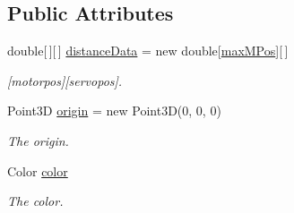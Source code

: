 \subsection*{Public Attributes}
\begin{DoxyCompactItemize}
\item 
\hypertarget{class_l_i_d_a_r___w_p_f___t_e_s_t_1_1_measurement_a3eeb9d0c5672c921c65c94ba69e1baa0}{}double\mbox{[}$\,$\mbox{]}\mbox{[}$\,$\mbox{]} \hyperlink{class_l_i_d_a_r___w_p_f___t_e_s_t_1_1_measurement_a3eeb9d0c5672c921c65c94ba69e1baa0}{distance\+Data} = new double\mbox{[}\hyperlink{class_l_i_d_a_r___w_p_f___t_e_s_t_1_1_measurement_a9605c77615e3be20ae9b2bcb0c3840c7}{max\+M\+Pos}\mbox{]}\mbox{[}$\,$\mbox{]}\label{class_l_i_d_a_r___w_p_f___t_e_s_t_1_1_measurement_a3eeb9d0c5672c921c65c94ba69e1baa0}

\begin{DoxyCompactList}\small\item\em \mbox{[}motorpos\mbox{]}\mbox{[}servopos\mbox{]}. \end{DoxyCompactList}\item 
\hypertarget{class_l_i_d_a_r___w_p_f___t_e_s_t_1_1_measurement_a7d54322660d56bf770949d58d70eda38}{}Point3\+D \hyperlink{class_l_i_d_a_r___w_p_f___t_e_s_t_1_1_measurement_a7d54322660d56bf770949d58d70eda38}{origin} = new Point3\+D(0, 0, 0)\label{class_l_i_d_a_r___w_p_f___t_e_s_t_1_1_measurement_a7d54322660d56bf770949d58d70eda38}

\begin{DoxyCompactList}\small\item\em The origin. \end{DoxyCompactList}\item 
\hypertarget{class_l_i_d_a_r___w_p_f___t_e_s_t_1_1_measurement_ab3dc896e9a7a696d1af21db05c76cbe5}{}Color \hyperlink{class_l_i_d_a_r___w_p_f___t_e_s_t_1_1_measurement_ab3dc896e9a7a696d1af21db05c76cbe5}{color}\label{class_l_i_d_a_r___w_p_f___t_e_s_t_1_1_measurement_ab3dc896e9a7a696d1af21db05c76cbe5}

\begin{DoxyCompactList}\small\item\em The color. \end{DoxyCompactList}\end{DoxyCompactItemize}
